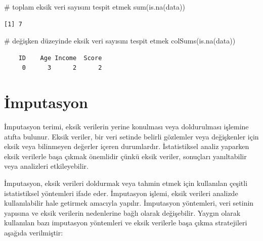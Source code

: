 \documentclass[
  letterpaper,
  DIV=11,
  numbers=noendperiod]{scrreprt}
\newenvironment{Shaded}{\begin{snugshade}}{\end{snugshade}}
\newcommand{\CommentTok}[1]{\textcolor[rgb]{0.37,0.37,0.37}{#1}}
\newcommand{\FunctionTok}[1]{\textcolor[rgb]{0.28,0.35,0.67}{#1}}
\newcommand{\NormalTok}[1]{\textcolor[rgb]{0.00,0.23,0.31}{#1}}
\begin{document}
\begin{Shaded}
\begin{Highlighting}[]
\CommentTok{\# toplam eksik veri sayısını tespit etmek}
\FunctionTok{sum}\NormalTok{(}\FunctionTok{is.na}\NormalTok{(data))}
\end{Highlighting}
\end{Shaded}

\begin{verbatim}
[1] 7
\end{verbatim}

\begin{Shaded}
\begin{Highlighting}[]
\CommentTok{\# değişken düzeyinde eksik veri sayısını tespit etmek}
\FunctionTok{colSums}\NormalTok{(}\FunctionTok{is.na}\NormalTok{(data)) }
\end{Highlighting}
\end{Shaded}

\begin{verbatim}
    ID    Age Income  Score 
     0      3      2      2 
\end{verbatim}

\section*{İmputasyon}\label{imputasyon}


İmputasyon terimi, eksik verilerin yerine konulması veya doldurulması
işlemine atıfta bulunur. Eksik veriler, bir veri setinde belirli
gözlemler veya değişkenler için eksik veya bilinmeyen değerler içeren
durumlardır. İstatistiksel analiz yaparken eksik verilerle başa çıkmak
önemlidir çünkü eksik veriler, sonuçları yanıltabilir veya analizleri
etkileyebilir.

İmputasyon, eksik verileri doldurmak veya tahmin etmek için kullanılan
çeşitli istatistiksel yöntemleri ifade eder. İmputasyon işlemi, eksik
verileri analizde kullanılabilir hale getirmek amacıyla yapılır.
İmputasyon yöntemleri, veri setinin yapısına ve eksik verilerin
nedenlerine bağlı olarak değişebilir. Yaygın olarak kullanılan bazı
imputasyon yöntemleri ve eksik verilerle başa çıkma stratejileri aşağıda
verilmiştir:
\end{document}
